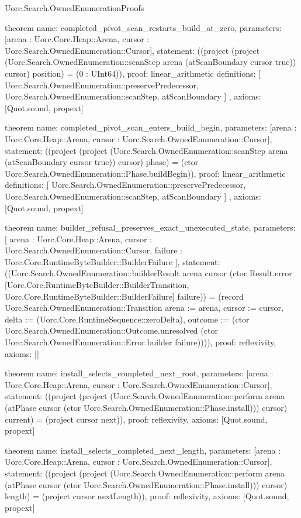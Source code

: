 \begin{lexlean}{Uorc.Search.OwnedEnumerationProofs}
\begin{semanticmodule}
theorem{
  name: completed_pivot_scan_restarts_build_at_zero,
  parameters: [arena : Uorc.Core.Heap::Arena, cursor : Uorc.Search.OwnedEnumeration::Cursor],
  statement: ((project (project (Uorc.Search.OwnedEnumeration::scanStep arena (atScanBoundary cursor true)) cursor) position) = (0 : UInt64)),
  proof: linear_arithmetic{
    definitions: [
      Uorc.Search.OwnedEnumeration::preservePredecessor,
      Uorc.Search.OwnedEnumeration::scanStep,
      atScanBoundary
    ]
  },
  axioms: [Quot.sound, propext]
}

theorem{
  name: completed_pivot_scan_enters_build_begin,
  parameters: [arena : Uorc.Core.Heap::Arena, cursor : Uorc.Search.OwnedEnumeration::Cursor],
  statement: ((project (project (Uorc.Search.OwnedEnumeration::scanStep arena (atScanBoundary cursor true)) cursor) phase) = (ctor Uorc.Search.OwnedEnumeration::Phase.buildBegin)),
  proof: linear_arithmetic{
    definitions: [
      Uorc.Search.OwnedEnumeration::preservePredecessor,
      Uorc.Search.OwnedEnumeration::scanStep,
      atScanBoundary
    ]
  },
  axioms: [Quot.sound, propext]
}

theorem{
  name: builder_refusal_preserves_exact_unexecuted_state,
  parameters: [
    arena : Uorc.Core.Heap::Arena,
    cursor : Uorc.Search.OwnedEnumeration::Cursor,
    failure : Uorc.Core.RuntimeByteBuilder::BuilderFailure
  ],
  statement: ((Uorc.Search.OwnedEnumeration::builderResult arena cursor (ctor Result.error [Uorc.Core.RuntimeByteBuilder::BuilderTransition, Uorc.Core.RuntimeByteBuilder::BuilderFailure] failure)) = (record Uorc.Search.OwnedEnumeration::Transition {arena := arena, cursor := cursor, delta := (Uorc.Core.RuntimeSequence::zeroDelta), outcome := (ctor Uorc.Search.OwnedEnumeration::Outcome.unresolved (ctor Uorc.Search.OwnedEnumeration::Error.builder failure))})),
  proof: reflexivity{},
  axioms: []
}

theorem{
  name: install_selects_completed_next_root,
  parameters: [arena : Uorc.Core.Heap::Arena, cursor : Uorc.Search.OwnedEnumeration::Cursor],
  statement: ((project (project (Uorc.Search.OwnedEnumeration::perform arena (atPhase cursor (ctor Uorc.Search.OwnedEnumeration::Phase.install))) cursor) current) = (project cursor next)),
  proof: reflexivity{},
  axioms: [Quot.sound, propext]
}

theorem{
  name: install_selects_completed_next_length,
  parameters: [arena : Uorc.Core.Heap::Arena, cursor : Uorc.Search.OwnedEnumeration::Cursor],
  statement: ((project (project (Uorc.Search.OwnedEnumeration::perform arena (atPhase cursor (ctor Uorc.Search.OwnedEnumeration::Phase.install))) cursor) length) = (project cursor nextLength)),
  proof: reflexivity{},
  axioms: [Quot.sound, propext]
}


\end{semanticmodule}
\end{lexlean}
